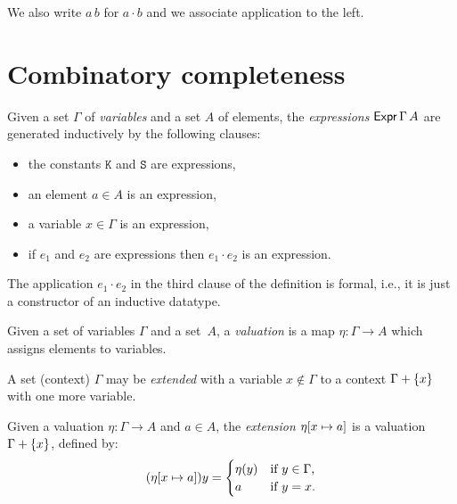 We also write $a \, b$ for $a \cdot b$ and we associate application to the left.

\section{Combinatory completeness}


\begin{definition}
  \label{def:expression}
  \leanok
  Given a set $\Gamma$ of \emph{variables} and a set $A$ of elements, the
  \emph{expressions} $\mathsf{Expr}\,\Gamma\,A$ are generated inductively by the following clauses:
  \begin{itemize}
    \item the constants $\mathtt{K}$ and $\mathtt{S}$ are expressions,
    \item an element $a \in A$ is an expression,
    \item a variable $x \in \Gamma$ is an expression,
    \item if $e_1$ and $e_2$ are expressions then $e_1 \cdot e_2$ is an expression.
  \end{itemize}
\end{definition}

\noindent
The application $e_1 \cdot e_2$ in the third clause of the definition is formal, i.e., it is just a constructor of an inductive datatype.

Given a set of variables $\Gamma$ and a set~$A$, a \emph{valuation} is a map $\eta : \Gamma \to A$ which assigns elements to variables.

\begin{definition}
  \label{def:extension}%
  \leanok
  A set (context) $\Gamma$ may be \emph{extended} with a variable $x \not\in \Gamma$ to
  a context $\Gamma + \{x\}$ with one more variable.
\end{definition}

\begin{definition}
  \label{def:extension}%
  \leanok
  Given a valuation $\eta : \Gamma \to A$ and $a \in A$, the
  \emph{extension} $\eta[x \mapsto a]$ is a valuation $\Gamma + \{x\}$, defined by:
  \begin{equation*}
    (\eta[x \mapsto a]) y =
    \begin{cases}
      \eta(y) &\text{if $y \in \Gamma$,}\\
      a       &\text{if $y = x$.}
    \end{cases}
  \end{equation*}
\end{definition}

